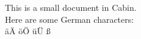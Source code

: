 \documentclass{article}
\begin{document}
This is a small document in Cabin.
\\
Here are some German characters:
\\
äÄ öÖ üÜ ß
\end{document}
